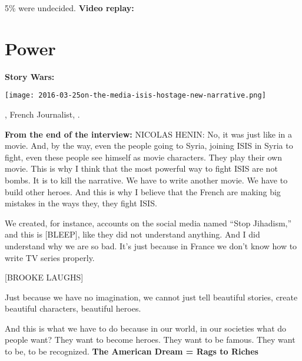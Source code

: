       5\% were undecided.
  \textbf{Video replay:}
\section{Power}
  
  \textbf{Story Wars:}
      
      
\begin{marginfigure}
  \texttt{[image: 2016-03-25on-the-media-isis-hostage-new-narrative.png]}
\end{marginfigure}
      
        , French Journalist, 
        .
  
  \footnotesize

  \textbf{From the end of the interview:}
    {
    NICOLAS HENIN: No, it was just like in a movie. And, by the way,
    even the people going to Syria, joining ISIS in Syria to fight,
    even these people see himself as movie characters.
    }
    {
    They play their own movie. 
    }
    {
    This is why I think that the most powerful way to fight ISIS
    are not bombs. 
    }
    {
    It is to kill the narrative. 
    }
    {
    We have to write another movie. 
    }
    {
      We have to build other heroes. 
    }
    {
      And this is why I believe that
      the French are making big mistakes in the ways they, they fight ISIS.
    }

    \medskip
    {
    We created, for instance, accounts on the social media named “Stop
    Jihadism,” and this is [BLEEP], like they did not understand
    anything. 
    }
    {
      And I did understand why we are so bad. 
    }
    {
      It's just because in
      France we don't know how to write TV series properly.
    }

    \medskip
    {
    [BROOKE LAUGHS]
    }

    \medskip
    {
      Just because we have no imagination, we cannot just tell beautiful
      stories, create beautiful characters, beautiful heroes. 
    }

    \medskip
    {
      And this is what we have to do because in our world, in our societies what do
      people want? 
    }
    {
      They want to become heroes. 
    }
    {
      They want to be famous. 
    }
    {
      They want to be, to be recognized.
    }
  \textbf{The American Dream = Rags to Riches}
    
